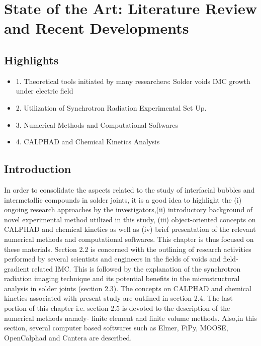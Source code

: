 \chapter{State of the Art: Literature Review and Recent Developments}\label{Chap2}

\section{Highlights}\label{Chap2_01}
\begin{itemize}
\item 1. Theoretical tools initiated by many researchers:
Solder voids
IMC growth under electric field

\item 2. Utilization of Synchrotron Radiation Experimental Set Up.

\item 3. Numerical Methods and Computational Softwares

\item 4. CALPHAD and Chemical Kinetics Analysis 
\end{itemize}

\section{Introduction}\label{Chap2_01}
In order to consolidate the aspects related to the study of interfacial bubbles and intermetallic compounds in solder joints, it is a good idea to highlight the (i) ongoing research approaches by the investigators,(ii) introductory background of novel experimental method utilized in this study, (iii) object-oriented concepts on CALPHAD and chemical kinetics as well as (iv) brief presentation of the relevant numerical methods and computational softwares. This chapter is thus focused on these materials. Section 2.2 is concerned with the outlining of research activities performed by several scientists and engineers in the fields of voids and field-gradient related IMC. This  is followed by the explanation of the synchrotron radiation imaging technique and its potential benefits in the microstructural analysis in solder joints (section 2.3). The concepts on CALPHAD and chemical kinetics associated with present study are outlined in section 2.4. The last portion of this chapter i.e. section 2.5 is devoted to the description of the numerical methods namely- finite element  and finite volume methods. Also,in this section, several computer based softwares such as Elmer, FiPy, MOOSE, OpenCalphad and Cantera are described.

